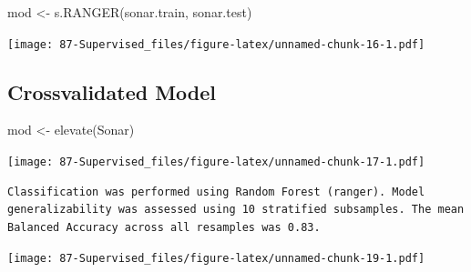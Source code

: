 \documentclass[
]{book}
\newenvironment{Shaded}{\begin{snugshade}}{\end{snugshade}}
\newcommand{\FunctionTok}[1]{\textcolor[rgb]{0.00,0.00,0.00}{#1}}
\newcommand{\NormalTok}[1]{#1}
\newcommand{\OtherTok}[1]{\textcolor[rgb]{0.56,0.35,0.01}{#1}}
\newcommand{\SpecialCharTok}[1]{\textcolor[rgb]{0.00,0.00,0.00}{#1}}
\begin{document}
\begin{Shaded}
\begin{Highlighting}[]
\NormalTok{mod }\OtherTok{\textless{}{-}} \FunctionTok{s.RANGER}\NormalTok{(sonar.train, sonar.test)}
\end{Highlighting}
\end{Shaded}

\texttt{[image: 87-Supervised\_files/figure-latex/unnamed-chunk-16-1.pdf]}

\hypertarget{crossvalidated-model-1}{%
\subsection{Crossvalidated Model}\label{crossvalidated-model-1}}

\begin{Shaded}
\begin{Highlighting}[]
\NormalTok{mod }\OtherTok{\textless{}{-}} \FunctionTok{elevate}\NormalTok{(Sonar)}
\end{Highlighting}
\end{Shaded}

\texttt{[image: 87-Supervised\_files/figure-latex/unnamed-chunk-17-1.pdf]}

\begin{Shaded}
\end{Shaded}

\begin{verbatim}
Classification was performed using Random Forest (ranger). Model generalizability was assessed using 10 stratified subsamples. The mean Balanced Accuracy across all resamples was 0.83.
\end{verbatim}

\begin{Shaded}
\end{Shaded}

\texttt{[image: 87-Supervised\_files/figure-latex/unnamed-chunk-19-1.pdf]}

\begin{Shaded}
\end{Shaded}
\end{document}
